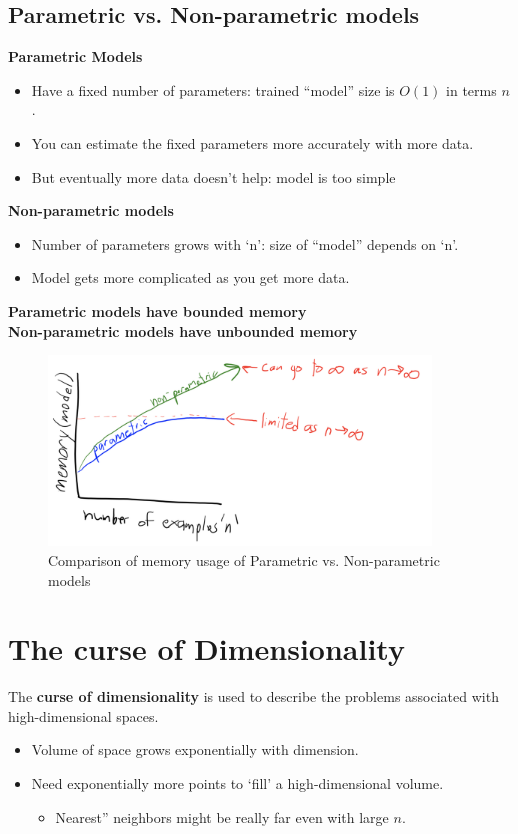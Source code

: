 \documentclass{article}
\theoremstyle{definition}
\begin{document}
\subsection*{Parametric vs. Non-parametric models}
\textbf{Parametric Models}
\begin{itemize}
	\item Have a fixed number of parameters: {\color{OliveGreen} trained “model” size is $ O(1) $ in terms $ n $.}
	\item You can estimate the fixed parameters more accurately with more data.
	\item But {\color{OliveGreen} eventually more data doesn’t help}: model is too simple
\end{itemize}
\textbf{Non-parametric models}
\begin{itemize}
	\item {\color{OliveGreen} Number of parameters grows with ‘n’}: size of “model” depends on ‘n’.
	\item Model gets {\color{OliveGreen} more complicated as you get more data.}
\end{itemize}
\textbf{\color{OliveGreen} Parametric models have bounded memory}\\
\textbf{\color{red} Non-parametric models have unbounded memory}
\begin{figure}[H]
	\centering
	\includegraphics[width = 4in]{Pic4}
	\caption{Comparison of memory usage of Parametric vs. Non-parametric models}
\end{figure}

\section*{The curse of Dimensionality}
The \textbf{\color{blue} curse of dimensionality} is used to describe the problems associated with high-dimensional spaces. 
\begin{itemize}
	\item Volume of space grows {\color{red} exponentially} with dimension.
	\item Need {\color{red} exponentially more points} to ‘fill’ a high-dimensional volume.
	\begin{itemize}
		\item Nearest” neighbors might be really far even with large $ n $.
	\end{itemize}
\end{itemize}
\end{document}
